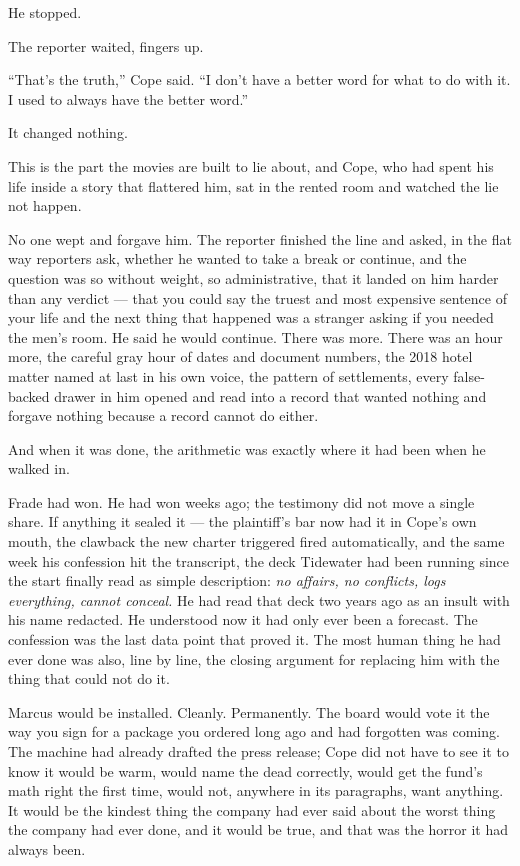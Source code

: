 \documentclass[11pt,openany]{book}
\newcommand{\scenebreak}{\par\vspace{0.5\baselineskip}\begin{center}\textasteriskcentered\quad\textasteriskcentered\quad\textasteriskcentered\end{center}\vspace{0.5\baselineskip}\par}
\begin{document}
He stopped.

The reporter waited, fingers up.

``That's the truth,'' Cope said. ``I don't have a better word for what to do with it. I used to always have the better word.''


\scenebreak


It changed nothing.

This is the part the movies are built to lie about, and Cope, who had spent his life inside a story that flattered him, sat in the rented room and watched the lie not happen.

No one wept and forgave him. The reporter finished the line and asked, in the flat way reporters ask, whether he wanted to take a break or continue, and the question was so without weight, so administrative, that it landed on him harder than any verdict --- that you could say the truest and most expensive sentence of your life and the next thing that happened was a stranger asking if you needed the men's room. He said he would continue. There was more. There was an hour more, the careful gray hour of dates and document numbers, the 2018 hotel matter named at last in his own voice, the pattern of settlements, every false-backed drawer in him opened and read into a record that wanted nothing and forgave nothing because a record cannot do either.

And when it was done, the arithmetic was exactly where it had been when he walked in.

Frade had won. He had won weeks ago; the testimony did not move a single share. If anything it sealed it --- the plaintiff's bar now had it in Cope's own mouth, the clawback the new charter triggered fired automatically, and the same week his confession hit the transcript, the deck Tidewater had been running since the start finally read as simple description: \textit{no affairs, no conflicts, logs everything, cannot conceal.} He had read that deck two years ago as an insult with his name redacted. He understood now it had only ever been a forecast. The confession was the last data point that proved it. The most human thing he had ever done was also, line by line, the closing argument for replacing him with the thing that could not do it.

Marcus would be installed. Cleanly. Permanently. The board would vote it the way you sign for a package you ordered long ago and had forgotten was coming. The machine had already drafted the press release; Cope did not have to see it to know it would be warm, would name the dead correctly, would get the fund's math right the first time, would not, anywhere in its paragraphs, want anything. It would be the kindest thing the company had ever said about the worst thing the company had ever done, and it would be true, and that was the horror it had always been.
\end{document}

